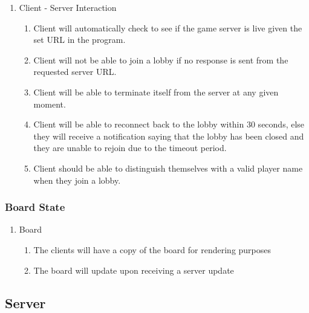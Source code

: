 \documentclass[10pt]{article}
\begin{document}
\begin{enumerate}[label*=R\arabic*.]
    \item Client - Server Interaction
    \begin{enumerate}[label*=\arabic*.]
        \item Client will automatically check to see if the game server is live given the set URL in the program.
        \item Client will not be able to join a lobby if no response is sent from the requested server URL.
        \item Client will be able to terminate itself from the server at any given moment.
        \item Client will be able to reconnect back to the lobby within 30 seconds, else they will receive a notification saying that the lobby has been closed and they are unable to rejoin due to the timeout period.
        \item Client should be able to distinguish themselves with a valid player name when they join a lobby.
    \end{enumerate}
\end{enumerate}

\subsubsection{Board State}

\begin{enumerate}[resume*]
    \item Board
    \begin{enumerate}[label*=\arabic*.]
        \item The clients will have a copy of the board for rendering purposes
        \item The board will update upon receiving a server update
    \end{enumerate}
\end{enumerate}

\subsection{Server}
\end{document}
